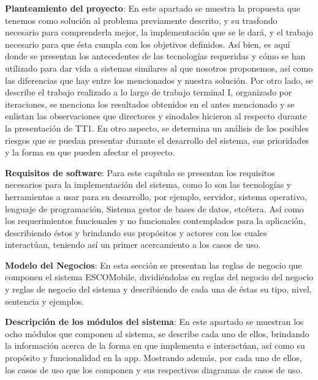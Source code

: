 \noindent
\textbf{Planteamiento del proyecto}: En este apartado se muestra la propuesta que tenemos como solución al problema previamente descrito, y su trasfondo necesario para comprenderla mejor, la implementación que se le dará, y el trabajo necesario para que ésta cumpla con los objetivos definidos. Así bien, es aquí donde se presentan los antecedentes de las tecnologías requeridas y cómo se han utilizado para dar vida a sistemas similares al que nosotros proponemos, así como las diferencias que hay entre los mencionados y nuestra solución. Por otro lado, se describe el trabajo realizado a lo largo de trabajo terminal I, organizado por iteraciones, se menciona los resultados obtenidos en el antes mencionado y se enlistan las observaciones que directores y sinodales hicieron al respecto durante la presentación de TT1. En otro aspecto, se determina un análisis de los posibles riesgos que se puedan presentar durante el desarrollo del sistema, sus prioridades y la forma en que pueden afectar el proyecto. 
\newline	

\noindent
\textbf{Requisitos de software}: Para este capítulo se presentan los requisitos necesarios para la implementación del sistema, como lo son las tecnologías y herramientas a usar para su desarrollo, por ejemplo, servidor, sistema operativo, lenguaje de programación, Sistema gestor de bases de datos, etcétera. Así como los requerimientos funcionales y no funcionales contemplados para la aplicación, describiendo éstos y brindando sus propósitos y actores con los cuales interactúan, teniendo así un primer acercamiento a los casos de uso.
\newline 

\noindent
\textbf{Modelo del Negocios}: En esta sección se presentan las reglas de negocio que componen el sistema ESCOMobile, dividiéndolas en reglas del negocio del negocio y reglas de negocio del sistema y describiendo de cada una de éstas su tipo, nivel, sentencia y ejemplos.
\newline

\noindent
\textbf{Descripción de los módulos del sistema}: En este apartado se muestran los ocho módulos que componen al sistema, se describe cada uno de ellos, brindando la información acerca de la forma en que implementa e interactúan, así como su propósito y funcionalidad en la app. Mostrando además, por cada uno de ellos, los casos de uso que los componen y sus respectivos diagramas de casos de uso.
\newline

